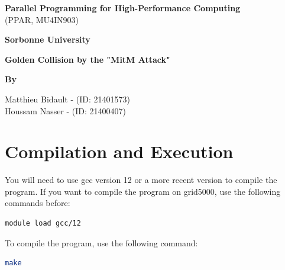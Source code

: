 \documentclass[12pt]{article}
\begin{document}
\begin{titlepage}
    \centering
    \vspace*{\fill}

    {\Large\textbf{Parallel Programming for High-Performance Computing}}\\
    (PPAR, MU4IN903)

    \vspace{1cm}

    {\Large\textbf{Sorbonne University}}

    \vspace{5cm}

    {\large\textbf{Golden Collision by the "MitM Attack"}}

    \vspace{1cm}

    {\large\textbf{By}}

    \vspace{1cm}

    {\Large Matthieu Bidault - (ID: 21401573)}\\
    {\Large Houssam Nasser - (ID: 21400407)}

    \vspace*{\fill}
\end{titlepage}

\section{Compilation and Execution}

You will need to use gcc version 12 or a more recent version to compile the program.
If you want to compile the program on grid5000, use the following commands before:
\begin{lstlisting}[language=bash]
module load gcc/12
\end{lstlisting}

To compile the program, use the following command:
\begin{lstlisting}[language=bash]
make
\end{lstlisting}
\end{document}
